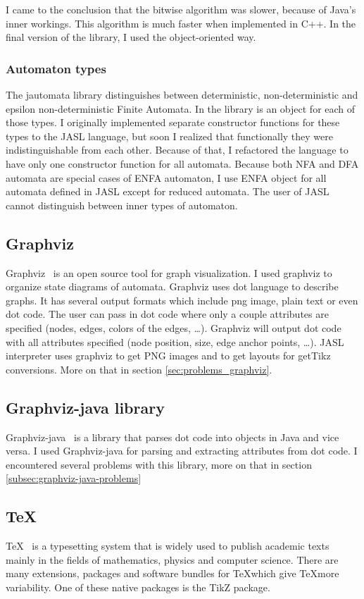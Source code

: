 \documentclass{ctuthesis}
\begin{document}
I came to the conclusion that the bitwise algorithm was slower, because of Java's inner workings. This algorithm is much faster when implemented in C++. In the final version of the library, I used the object-oriented way.

\subsubsection{Automaton types}
The jautomata library distinguishes between deterministic, non-deterministic and epsilon non-deterministic Finite Automata. In the library is an object for each of those types. I originally implemented separate constructor functions for these types to the JASL language, but soon I realized that functionally they were indistinguishable from each other. Because of that, I refactored the language to have only one constructor function for all automata. Because both NFA and DFA automata are special cases of ENFA automaton, I use ENFA object for all automata defined in JASL except for reduced automata. The user of JASL cannot distinguish between inner types of automaton.


\subsection{Graphviz}

Graphviz~\cite{graphviz} is an open source tool for graph visualization. I used graphviz to organize state diagrams of automata. Graphviz uses dot language to describe graphs. It has several output formats which include png image, plain text or even dot code. The user can pass in dot code where only a couple attributes are specified (nodes, edges, colors of the edges, \ldots). Graphviz will output dot code with all attributes specified (node position, size, edge anchor points, \ldots).  JASL interpreter uses graphviz to get PNG images and to get layouts for getTikz conversions. More on that in section \ref{sec:problems_graphviz}.

\subsection{Graphviz-java library}
Graphviz-java~\cite{graphviz-java} is a library that parses dot code into objects in Java and vice versa. I used Graphviz-java for parsing and extracting attributes from dot code. I encountered several problems with this library, more on that in section \ref{subsec:graphviz-java-problems}

\subsection{\TeX}
\TeX~\cite{tex} is a typesetting system that is widely used to publish academic texts mainly in the fields of mathematics, physics and computer science. There are many extensions, packages and software bundles for \TeX which give \TeX more variability. One of these native packages is the TikZ package.
\end{document}
